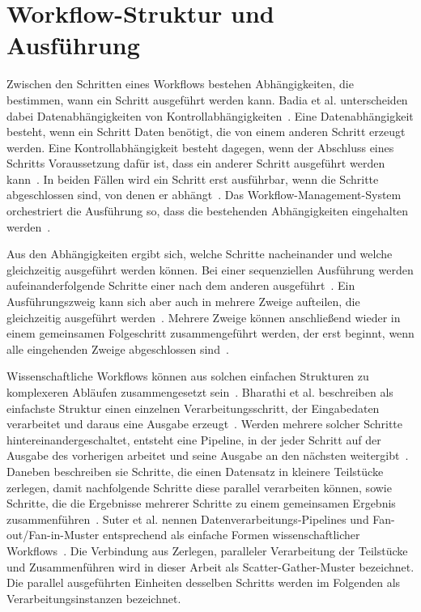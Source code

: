 \section{Workflow-Struktur und Ausführung}
\label{sec:basics:struktur}
Zwischen den Schritten eines Workflows bestehen Abhängigkeiten, die
bestimmen, wann ein Schritt ausgeführt werden kann. Badia et al.
unterscheiden dabei Datenabhängigkeiten von
Kontrollabhängigkeiten~\cite[S.~28]{badia2017workflows}. Eine
Datenabhängigkeit besteht, wenn ein Schritt Daten benötigt, die
von einem anderen Schritt erzeugt werden. Eine
Kontrollabhängigkeit besteht dagegen, wenn der Abschluss eines
Schritts Voraussetzung dafür ist, dass ein anderer Schritt
ausgeführt werden kann~\cite[S.~259]{zhou2008control}. In beiden Fällen wird ein Schritt erst ausführbar, wenn
die Schritte abgeschlossen sind, von denen er
abhängt~\cite[S.~8,~10]{russell2006patterns}. Das
Workflow-Management-System orchestriert die Ausführung so, dass die
bestehenden Abhängigkeiten eingehalten
werden~\cite[S.~4]{suter2026terminology}.
 
Aus den Abhängigkeiten ergibt sich, welche Schritte nacheinander und
welche gleichzeitig ausgeführt werden können. Bei einer sequenziellen Ausführung werden aufeinanderfolgende Schritte einer nach dem anderen
ausgeführt~\cite[S.~8]{russell2006patterns}.
Ein Ausführungszweig kann sich aber auch in mehrere Zweige
aufteilen, die gleichzeitig ausgeführt
werden~\cite[S.~9]{russell2006patterns}. Mehrere Zweige können anschließend wieder in einem gemeinsamen Folgeschritt zusammengeführt werden, der erst beginnt, wenn alle eingehenden Zweige abgeschlossen sind~\cite[S.~10]{russell2006patterns}.

Wissenschaftliche Workflows können aus solchen einfachen Strukturen
zu komplexeren Abläufen zusammengesetzt
sein~\cite[S.~2]{bharathi2008characterization}. Bharathi et al.
beschreiben als einfachste Struktur einen einzelnen
Verarbeitungsschritt, der Eingabedaten verarbeitet und daraus eine
Ausgabe erzeugt~\cite[S.~3]{bharathi2008characterization}. Werden mehrere solcher Schritte hintereinandergeschaltet, entsteht eine Pipeline, in der jeder Schritt auf der Ausgabe des vorherigen
arbeitet und seine Ausgabe an den nächsten weitergibt~\cite[S.~3]{bharathi2008characterization}.
Daneben beschreiben sie Schritte, die einen Datensatz in kleinere
Teilstücke zerlegen, damit nachfolgende Schritte diese parallel
verarbeiten können, sowie Schritte, die die Ergebnisse mehrerer
Schritte zu einem gemeinsamen Ergebnis
zusammenführen~\cite[S.~3]{bharathi2008characterization}. Suter et
al. nennen Datenverarbeitungs-Pipelines und Fan-out/Fan-in-Muster
entsprechend als einfache Formen wissenschaftlicher
Workflows~\cite[S.~4]{suter2026terminology}. Die Verbindung aus
Zerlegen, paralleler Verarbeitung der Teilstücke und Zusammenführen
wird in dieser Arbeit als Scatter-Gather-Muster bezeichnet. Die
parallel ausgeführten Einheiten desselben Schritts werden im
Folgenden als Verarbeitungsinstanzen bezeichnet.



